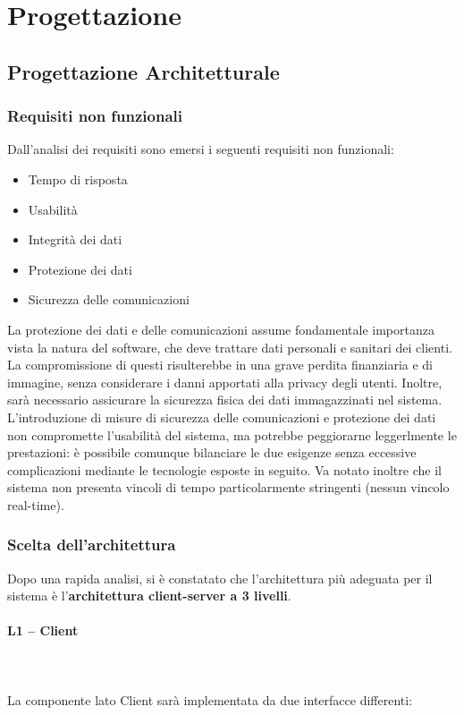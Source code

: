 \newpage
\section{Progettazione}

\subsection{Progettazione Architetturale}

\subsubsection{Requisiti non funzionali}

Dall'analisi dei requisiti sono emersi i seguenti requisiti non funzionali:
\begin{itemize}
\item Tempo di risposta
\item Usabilità
\item Integrità dei dati
\item Protezione dei dati 
\item Sicurezza delle comunicazioni
\end{itemize}
La protezione dei dati e delle comunicazioni assume fondamentale importanza vista la natura del software, 
che deve trattare dati personali e sanitari dei clienti. 
La compromissione di questi risulterebbe in una grave perdita finanziaria e di immagine, senza considerare i danni apportati alla privacy degli utenti. 
Inoltre, sarà necessario assicurare la sicurezza fisica dei dati immagazzinati nel sistema.
L'introduzione di misure di sicurezza delle comunicazioni e protezione dei dati non compromette l'usabilità del sistema, ma potrebbe peggiorarne leggerlmente le prestazioni: 
è possibile comunque bilanciare le due esigenze senza eccessive complicazioni mediante le tecnologie esposte in seguito. 
Va notato inoltre che il sistema non presenta vincoli di tempo particolarmente stringenti (nessun vincolo real-time).


\subsubsection{Scelta dell'architettura}

Dopo una rapida analisi, si è constatato che l'architettura più adeguata per il sistema è l'\textbf{architettura client-server a 3 livelli}.

\paragraph{L1 -- Client}\mbox{}\\ \\
La componente lato Client sarà implementata da due interfacce differenti:

